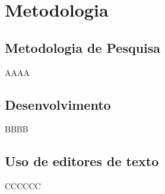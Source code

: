 \chapter[Metodologia]{Metodologia}
\label{sec:metodologia}

\section{Metodologia de Pesquisa}
\label{sec:metodologia_de_pesquisa}

AAAA
\section{Desenvolvimento}
\label{sec:metodologia_de_desenvolvimento_de_software}

BBBB

\section{Uso de editores de texto}

CCCCCC

